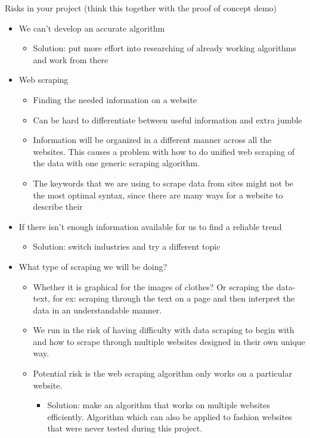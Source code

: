 \documentclass{article}
\begin{document}
Risks in your project (think this together with the proof of concept demo)
\begin{itemize}
\item We can’t develop an accurate algorithm
	\begin{itemize}
		\item Solution: put more effort into researching of already working algorithms and work from there
	\end{itemize}
\item Web scraping
\begin{itemize}
\item  Finding the needed information on a website
\end{itemize}
\begin{itemize}

\item Can be hard to differentiate between useful information and extra jumble 
\item Information will be organized in a different manner across all the websites. This causes a problem with how to do unified web scraping of the data with one generic scraping algorithm.
\item The keywords that we are using to scrape data from sites might not be the most optimal syntax, since there are many ways for a website to describe their 
\end{itemize}
\item If there isn’t enough information available for us to find a reliable trend
\begin{itemize}
\item Solution: switch industries and try a different topic
\end{itemize}
\item What type of scraping we will be doing?
\begin{itemize}
\item Whether it is graphical for the images of clothes? Or scraping the data-text, for ex: scraping through the text on a page and then interpret the data in an understandable manner. 
\item We run in the risk of having difficulty with data scraping to begin with and how to scrape through multiple websites designed in their own unique way. 
\item Potential risk is the web scraping algorithm only works on a particular website. 
\begin{itemize}
\item Solution: make an algorithm that works on multiple websites efficiently. Algorithm which can also be applied to fashion websites that were never tested during this project.
\end{itemize}
\end{itemize}

\end{itemize}
	
\end{document}
